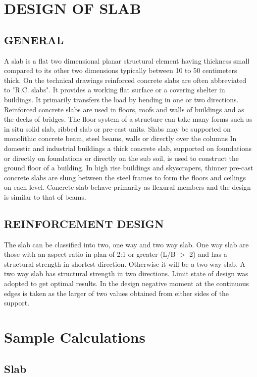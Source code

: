 	
\section{DESIGN OF SLAB}
\subsection{ GENERAL}
A slab is a flat two dimensional planar structural element having thickness small compared to its other two dimensions typically between 10 to 50 centimeters thick. On the technical drawings reinforced concrete slabs are often abbreviated to "R.C. slabs". It provides a working flat surface or a covering shelter in buildings. It primarily transfers the load by bending in one or two directions. Reinforced concrete slabs are used in floors, roofs and walls of buildings and as the decks of bridges. The floor system of a structure can take many forms such as in situ solid slab, ribbed slab or pre-cast units. Slabs may be supported on monolithic concrete beam, steel beams, walls or directly over the columns In domestic and industrial buildings a thick concrete slab, supported on foundations or directly on foundations or directly on the sub soil, is used to construct the ground floor of a building. In high rise buildings and skyscrapers, thinner pre-cast concrete slabs are slung between the steel frames to form the floors and ceilings on each level. Concrete slab behave primarily as flexural members and the design is similar to that of beams. 
\subsection{REINFORCEMENT DESIGN}
The slab can be classified into two, one way and two way slab. One way slab are those with an aspect ratio in plan of 2:1 or greater (L/B $ > $ 2) and has a  structural strength in shortest direction. Otherwise it will be a two way slab.  A two way slab has structural strength in two directions. Limit state of design was adopted to get optimal results. In the design negative moment at the continuous edges is taken as the larger of two values obtained from either sides of the support.
\section{Sample Calculations}
\subsection{Slab} 

